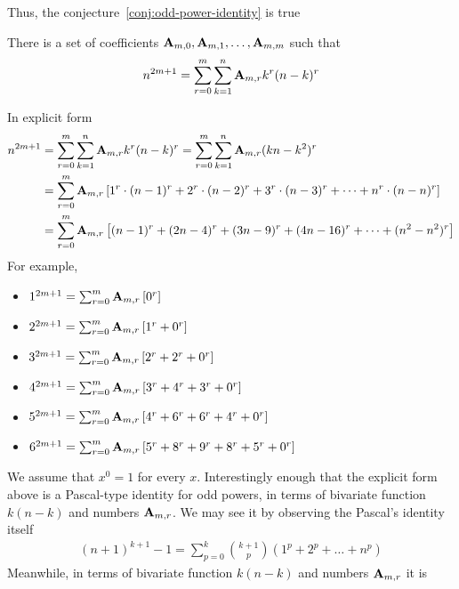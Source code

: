 Thus, the conjecture~\eqref{conj:odd-power-identity} is true

\begin{theorem}
    \label{theorem:odd-power-identity}
    There is a set of coefficients ${\mathbf{A}} \sb{m,0}, {\mathbf{A}} \sb{m,1}, \ldots, {\mathbf{A}} \sb{m,m}$ such that
    \begin{align*}
        n^{2m+1} = \sum_{r=0}^{m} \sum_{k=1}^{n} {\mathbf{A}} \sb{m,r} k^r (n-k)^r
    \end{align*}
\end{theorem}
In explicit form
\begin{align*}
    n^{2m+1}
    &= \sum_{r=0}^{m} \sum_{k=1}^{n} {\mathbf{A}} \sb{m,r} k^r (n-k)^r = \sum_{r=0}^{m} \sum_{k=1}^{n} {\mathbf{A}} \sb{m,r} (kn-k^2)^r \\
    &= \sum_{r=0}^{m} {\mathbf{A}} \sb{m,r} \left[ 1^r \cdot (n-1)^r + 2^r \cdot (n-2)^r + 3^r \cdot (n-3)^r + \cdots + n^r \cdot (n-n)^r  \right] \\
    &= \sum_{r=0}^{m} {\mathbf{A}} \sb{m,r} \left[ (n-1)^r + (2n-4)^r + (3n-9)^r + (4n-16)^r + \cdots +  (n^2-n^2)^r  \right]
\end{align*}
For example,
\begin{itemize}
    \item $1^{2m+1} = \sum_{r=0}^{m} {\mathbf{A}} \sb{m,r} \left[ 0^r  \right]$
    \item $2^{2m+1} = \sum_{r=0}^{m} {\mathbf{A}} \sb{m,r} \left[ 1^r + 0^r  \right]$
    \item $3^{2m+1} = \sum_{r=0}^{m} {\mathbf{A}} \sb{m,r} \left[ 2^r + 2^r + 0^r  \right]$
    \item $4^{2m+1} = \sum_{r=0}^{m} {\mathbf{A}} \sb{m,r} \left[ 3^r + 4^r + 3^r + 0^r  \right]$
    \item $5^{2m+1} = \sum_{r=0}^{m} {\mathbf{A}} \sb{m,r} \left[ 4^r + 6^r + 6^r + 4^r + 0^r  \right]$
    \item $6^{2m+1} = \sum_{r=0}^{m} {\mathbf{A}} \sb{m,r} \left[ 5^r + 8^r + 9^r + 8^r + 5^r + 0^r  \right]$
\end{itemize}
We assume that $x^0=1$ for every $x$.
Interestingly enough that the explicit form above is a Pascal-type identity for odd powers,
in terms of bivariate function $k(n-k)$ and numbers ${\mathbf{A}} \sb{m,r}$.
We may see it by observing the Pascal's identity itself~\cite{macmillan2011proofs}
\begin{align*}
(n+1)
    ^{k+1}-1=\sum _{p=0}^{k}{\binom {k+1}{p}}(1^{p}+2^{p}+\dots +n^{p})
\end{align*}
Meanwhile, in terms of bivariate function $k(n-k)$ and numbers ${\mathbf{A}} \sb{m,r}$ it is
